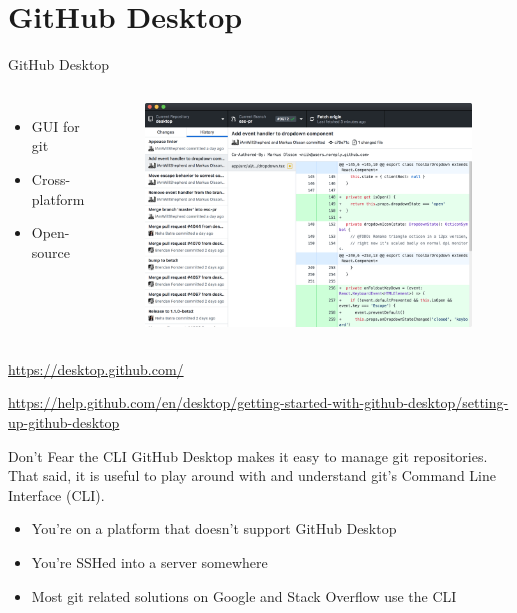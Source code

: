 \documentclass{beamer}
\begin{document}
    \section{GitHub Desktop}\label{sec:github-desktop}
    \begin{frame}{GitHub Desktop}
        \begin{columns}
            \begin{itemize}
                \item GUI for git
                \item Cross-platform
                \item Open-source
            \end{itemize}

            \begin{figure}
                \centering
                \includegraphics[width=\textwidth]{figures/github-desktop-screenshot-mac.png}
            \end{figure}
        \end{columns}
        \centering
        \url{https://desktop.github.com/}

        \url{https://help.github.com/en/desktop/getting-started-with-github-desktop/setting-up-github-desktop}
    \end{frame}

    \begin{frame}{Don't Fear the CLI}
        GitHub Desktop makes it easy to manage git repositories. That said, it is useful to play around with and understand git's Command Line Interface (CLI).
        \begin{itemize}
            \item You're on a platform that doesn't support GitHub Desktop
            \item You're SSHed into a server somewhere
            \item Most git related solutions on Google and Stack Overflow use the CLI
        \end{itemize}
    \end{frame}
\end{document}
